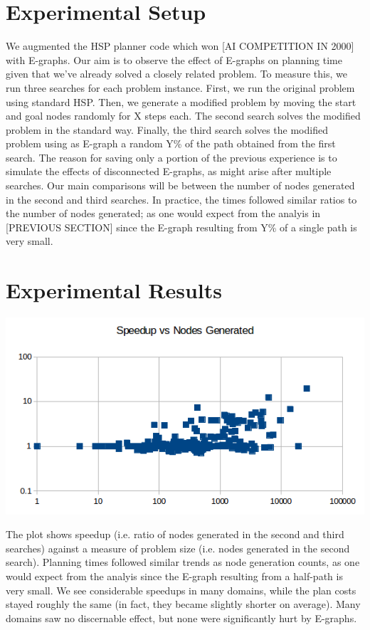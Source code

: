 \documentclass[letterpaper]{article}
\begin{document}
\section{Experimental Setup}

We augmented the HSP planner code \cite{bonet2001planning} which won [AI COMPETITION IN 2000] with E-graphs. Our aim is to observe the effect of E-graphs on planning time given that we've already solved a closely related problem. To measure this, we run three searches for each problem instance. First, we run the original problem using standard HSP. Then, we generate a modified problem by moving the start and goal nodes randomly for X steps each. The second search solves the modified problem in the standard way. Finally, the third search solves the modified problem using as E-graph a random Y\% of the path obtained from the first search. The reason for saving only a portion of the previous experience is to simulate the effects of disconnected E-graphs, as might arise after multiple searches. Our main comparisons will be between the number of nodes generated in the second and third searches. In practice, the times followed similar ratios to the number of nodes generated; as one would expect from the analyis in [PREVIOUS SECTION] since the E-graph resulting from Y\% of a single path is very small.

\section{Experimental Results}

\includegraphics[scale=0.4]{AIPlot.png}

The plot shows speedup (i.e. ratio of nodes generated in the second and third searches) against a measure of problem size (i.e. nodes generated in the second search). Planning times followed similar trends as node generation counts, as one would expect from the analyis since the E-graph resulting from a half-path is very small. We see considerable speedups in many domains, while the plan costs stayed roughly the same (in fact, they became slightly shorter on average). Many domains saw no discernable effect, but none were significantly hurt by E-graphs.
\end{document}
